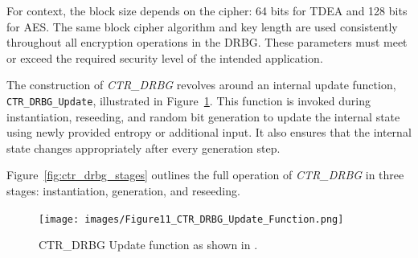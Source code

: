 For context, the block size depends on the cipher: 64 bits for TDEA and 128 bits for AES. The same block cipher algorithm and key length are used consistently throughout all encryption operations in the DRBG. These parameters must meet or exceed the required security level of the intended application.

The construction of \textit{CTR\_DRBG} revolves around an internal update function, \texttt{CTR\_DRBG\_Update}, illustrated in Figure~\ref{fig:ctr_drbg_update}. This function is invoked during instantiation, reseeding, and random bit generation to update the internal state using newly provided entropy or additional input. It also ensures that the internal state changes appropriately after every generation step.

Figure~\ref{fig:ctr_drbg_stages} outlines the full operation of \textit{CTR\_DRBG} in three stages: instantiation, generation, and reseeding.

\begin{figure}[htbp]
    \centering
    \texttt{[image: images/Figure11\_CTR\_DRBG\_Update\_Function.png]}
    \caption{CTR\_DRBG Update function as shown in \cite{nist80090a}.}
    \label{fig:ctr_drbg_update}
\end{figure}

